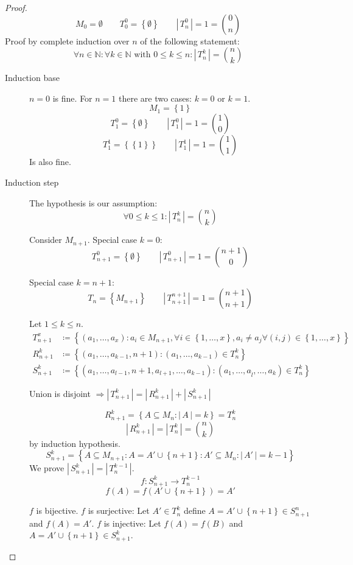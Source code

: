 \documentclass[a4paper,landscape,twocolumn]{article}
\theoremstyle{definition}
\newcommand\set[1]{\left\{#1\right\}}
\newcommand\card[1]{\left|\,#1\,\right|}
\begin{document}
\begin{proof}
  \[
      M_0 = \emptyset \qquad
      T_0^0 = \set{\emptyset} \qquad
      \card{T_n^0} = 1 = \binom{0}{n}
  \]
  Proof by complete induction over $n$ of the following statement:
  \[
    \forall n \in \mathbb{N}: \forall k \in \mathbb{N} \text{ with } 0 \leq k \leq n:
    \card{T_n^k} = \binom{n}{k}
  \]
  \begin{description}
    \item[Induction base]
      $n = 0$ is fine.
      For $n = 1$ there are two cases: $k = 0$ or $k = 1$.
      \[ M_1 = \set{1} \]
      \[ T_1^0 = \set{\emptyset} \qquad \card{T_1^0} = 1 = \binom{1}{0} \]
      \[ T_1^1 = \set{\set{1}} \qquad \card{T_1^1} = 1 = \binom{1}{1} \]
      Is also fine.
    \item[Induction step]
      The hypothesis is our assumption:
      \[ \forall 0 \leq k \leq 1: \card{T_n^k} = \binom{n}{k} \]

      Consider $M_{n+1}$. Special case $k = 0$:
      \[ T_{n+1}^0 = \set{\emptyset} \qquad \card{T_{n+1}^0} = 1 = \binom{n+1}{0} \]

      Special case $k = n + 1$:
      \[ T_n^{} = \set{M_{n+1}} \qquad \card{T_{n+1}^{n+1}} = 1 = \binom{n+1}{n+1} \]

      Let $1 \leq k \leq n$.
      \begin{align*}
        T_{n+1}^x &\coloneqq \set{(a_1, \ldots, a_x) : a_i \in M_{n+1}, \forall i \in \set{1, \ldots, x}, a_i \neq a_j \forall (i,j) \in \set{1, \ldots, x}} \\
        R_{n+1}^k &\coloneqq \set{(a_1, \ldots, a_{k-1}, n+1): (a_1, \ldots, a_{k-1}) \in T_n^k} \\
        S_{n+1}^k &\coloneqq \set{(a_1, \ldots, a_{l-1}, n+1, a_{l+1}, \ldots, a_{k-1}): (a_1, \ldots, a_{\hat{l}}, \ldots, a_k) \in T_n^k}
      \end{align*}

      Union is disjoint $\Rightarrow \card{T_{n+1}^k} = \card{R_{n+1}^k} + \card{S_{n+1}^k}$

      \[ R_{n+1}^k = \set{A \subseteq M_n: \card{A} = k} = T_n^k \]
      \[ \card{R_{n+1}^k} = \card{T_n^k} = \binom{n}{k} \]
      by induction hypothesis.
      \[ S_{n+1}^k = \set{A \subseteq M_{n+1}: A = A' \cup \set{n+1}: A' \subseteq M_n: \card{A'} = k - 1} \]
      We prove $\card{S_{n+1}^k} = \card{T_n^{k-1}}$.
      \[ f: S_{n+1}^k \rightarrow T_n^{k-1} \]
      \[ f(A) = f(A' \cup \set{n+1}) = A' \]

      $f$ is bijective.
      $f$ is surjective: Let $A' \in T_n^k$ define $A = A' \cup \set{n+1} \in S_{n+1}^n$ and $f(A) = A'$.
      $f$ is injective: Let $f(A) = f(B)$ and $A = A' \cup \set{n+1} \in S_{n+1}^k$.


\end{description}
\end{proof}
\end{document}
